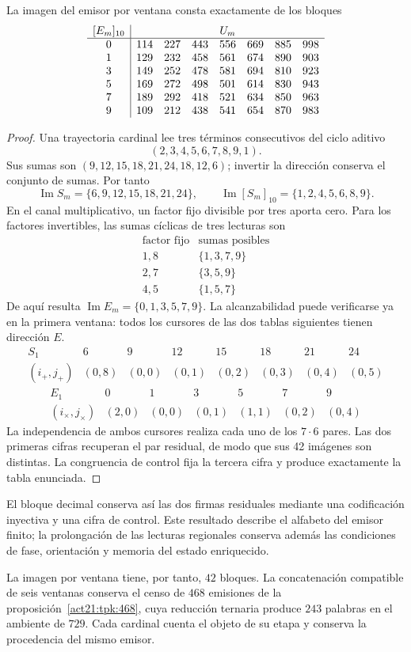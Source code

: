\begin{proposition}
La imagen del emisor por ventana consta exactamente de los bloques
\[
\begin{array}{c|rrrrrrr}
[E_m]_{10}&\multicolumn{7}{c}{U_m}\\ \hline
0&114&227&443&556&669&885&998\\
1&129&232&458&561&674&890&903\\
3&149&252&478&581&694&810&923\\
5&169&272&498&501&614&830&943\\
7&189&292&418&521&634&850&963\\
9&109&212&438&541&654&870&983
\end{array}
\]
\end{proposition}
\begin{proof}
Una trayectoria cardinal lee tres términos consecutivos del ciclo aditivo
\[
 (2,3,4,5,6,7,8,9,1).
\]
Sus sumas son
$(9,12,15,18,21,24,18,12,6)$; invertir la dirección conserva el conjunto
de sumas. Por tanto
\[
 \operatorname{Im}S_m=\{6,9,12,15,18,21,24\},\qquad
 \operatorname{Im}[S_m]_{10}=\{1,2,4,5,6,8,9\}.
\]
En el canal multiplicativo, un factor fijo divisible por tres aporta cero.
Para los factores invertibles, las sumas cíclicas de tres lecturas son
\[
\begin{array}{c|c}
\text{factor fijo}&\text{sumas posibles}\\\hline
1,8&\{1,3,7,9\}\\
2,7&\{3,5,9\}\\
4,5&\{1,5,7\}
\end{array}
\]
De aquí resulta $\operatorname{Im}E_m=\{0,1,3,5,7,9\}$.
La alcanzabilidad puede verificarse ya en la primera ventana: todos los
cursores de las dos tablas siguientes tienen dirección $E$.
\[
\begin{array}{c|rrrrrrr}
S_1&6&9&12&15&18&21&24\\\hline
(i_+,j_+)&(0,8)&(0,0)&(0,1)&(0,2)&(0,3)&(0,4)&(0,5)
\end{array}
\]
\[
\begin{array}{c|rrrrrr}
E_1&0&1&3&5&7&9\\\hline
(i_\times,j_\times)&(2,0)&(0,0)&(0,1)&(1,1)&(0,2)&(0,4)
\end{array}
\]
La independencia de ambos cursores realiza cada uno de los $7\cdot6$
pares. Las dos primeras cifras recuperan el par residual, de modo que sus
42 imágenes son distintas. La congruencia de control fija la tercera cifra
y produce exactamente la tabla enunciada.
\end{proof}

El bloque decimal conserva así las dos firmas residuales mediante una
codificación inyectiva y una cifra de control. Este resultado describe el
alfabeto del emisor finito; la prolongación de las lecturas regionales
conserva además las condiciones de fase, orientación y memoria del estado
enriquecido.

La imagen por ventana tiene, por tanto, \(42\) bloques. La concatenación
compatible de seis ventanas conserva el censo de \(468\) emisiones de
la proposición~\ref{act21:tpk:468}, cuya reducción ternaria produce
\(243\) palabras en el ambiente de \(729\). Cada cardinal cuenta el
objeto de su etapa y conserva la procedencia del mismo emisor.
